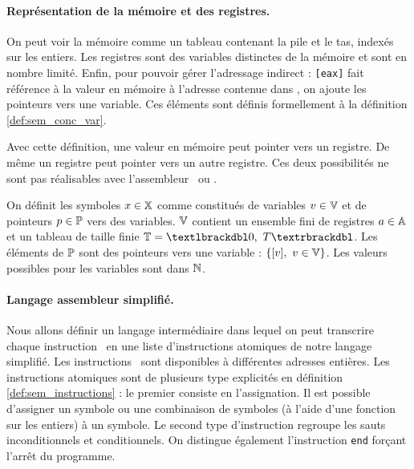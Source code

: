 
\paragraph{Représentation de la mémoire et des registres.}
On peut voir la mémoire comme un tableau contenant la pile et le tas, indexés sur les entiers. Les registres sont des variables distinctes de la mémoire et sont en nombre limité. Enfin, pour pouvoir gérer l'adressage indirect : \texttt{[eax]} fait référence à la valeur en mémoire à l'adresse contenue dans \eax, on ajoute les pointeurs vers une variable. Ces éléments sont définis formellement à la définition \ref{def:sem_conc_var}.

\begin{rem}
 Avec cette définition, une valeur en mémoire peut pointer vers un registre. De même un registre peut pointer vers un autre registre.
 Ces deux possibilités ne sont pas réalisables avec l'assembleur \xq\ ou \xs.
\end{rem}


\begin{defi}
On définit les symboles $x\in\mathbb X$ comme constitués de variables $v\in\mathbb V$ et de pointeurs $p\in\mathbb P$ vers des variables. $\mathbb V$ contient un ensemble fini de registres $a\in\mathbb A$ et un tableau de taille finie $\BT=\textlbrackdbl 0,\ T\textrbrackdbl$. Les éléments de $\mathbb P$ sont des pointeurs vers une variable : $\{[v],\ v\in \mathbb V\}$.
Les valeurs possibles pour les variables sont dans $\mathbb N$.
\label{def:sem_conc_var}
\end{defi}

\paragraph{Langage assembleur simplifié.} Nous allons définir un langage intermédiaire dans lequel on peut transcrire chaque instruction \xq\ en une liste d'instructions atomiques de notre langage simplifié.
Les instructions \xq\ sont disponibles à différentes adresses entières. 
Les instructions atomiques sont de plusieurs type explicités en définition \ref{def:sem_instructions} : le premier consiste en l'assignation.
Il est possible d'assigner un symbole ou une combinaison de symboles (à l'aide d'une fonction sur les entiers) à un symbole. 
Le second type d'instruction regroupe les sauts inconditionnels et conditionnels.
On distingue également l'instruction \texttt{end} forçant l'arrêt du programme.

